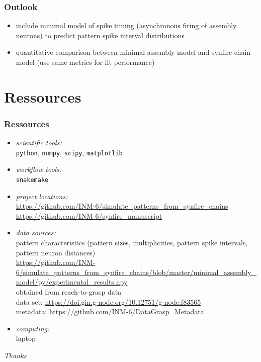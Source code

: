 \documentclass[8pt,t,usepdftitle=false]{beamer}
\begin{document}
\def\ttl{Outlook}
\begin{frame}[plain]
  \frametitle{\ttl}
  \begin{itemize}
  \item include minimal model of spike timing (asynchronous firing of assembly neurons) to predict pattern spike interval distributions
  \item quantitative comparison between minimal assembly model and synfire-chain model (use same metrics for fit performance)
  \end{itemize}
\end{frame}
\def\ttl{Ressources}
\section{\ttl}
\begin{frame}[plain]
  \frametitle{\ttl}
  \begin{itemize}\itemsep2ex
  \item \emph{scientific tools:}\\
    \texttt{python}, \texttt{numpy}, \texttt{scipy}, \texttt{matplotlib}
  \item \emph{workflow tools:}\\
    \texttt{snakemake}
  \item \emph{project locations:}\\
    \url{https://github.com/INM-6/simulate_patterns_from_synfire_chains}\\
    \url{https://github.com/INM-6/synfire_manuscript}    
  \item \emph{data sources:}\\
    pattern characteristics (pattern sizes, multiplicities, pattern spike intervals, pattern neuron distances)\\[1ex]   \url{https://github.com/INM-6/simulate_patterns_from_synfire_chains/blob/master/minimal_assembly_model/py/experimental_results.npy}\\[1ex]
    obtained from reach-to-grasp data \parencite{Riehle13_48}\\[1ex]
    data set: \url{https://doi.gin.g-node.org/10.12751/g-node.f83565}\\
    metadata: \url{https://github.com/INM-6/DataGrasp_Metadata}   
  \item \emph{computing:}\\
    laptop
  \end{itemize}
  \end{frame}
\begin{frame}[t,plain]
  \begin{center}
    \vspace*{\fill}
    \LARGE\emph{\it Thanks}
    \vspace*{\fill}
  \end{center}
\end{frame}
\end{document}
